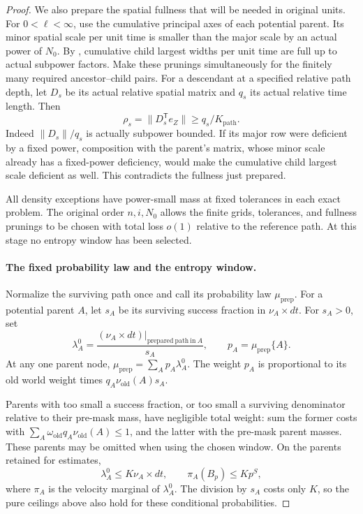 \begin{proof}
We also prepare the spatial fullness that will be needed in original
units.  For \(0<\ell<\infty\), use the cumulative principal axes of
each potential parent.  Its minor spatial scale per unit time is
smaller than the major scale by an actual power of \(N_0\).  By
, cumulative child largest widths per unit
time are full up to actual subpower factors.  Make these prunings
simultaneously for the finitely many required ancestor--child pairs.
For a descendant at a specified relative path depth, let \(D_s\) be
its actual relative spatial matrix and \(q_s\) its actual relative
time length.  Then
\[
 \rho_s=\|D_s^{\mathsf T}e_Z\|
       \ge q_s/K_{\mathrm{path}}.
\]
Indeed \(\|D_s\|/q_s\) is actually subpower bounded.  If its major
row were deficient by a fixed power, composition with the parent's
matrix, whose minor scale already has a fixed-power deficiency, would
make the cumulative child largest scale deficient as well.  This
contradicts the fullness just prepared.

All density exceptions have power-small mass at fixed tolerances in
each exact problem.  The original order \(n,i,N_0\) allows the finite
grids, tolerances, and fullness prunings to be chosen with total loss
\(o(1)\) relative to the reference path.  At this stage no entropy
window has been selected.

\paragraph{The fixed probability law and the entropy window.}
Normalize the surviving path once and call its probability law
\(\mu_{\mathrm{prep}}\).  For a potential parent \(A\), let \(s_A\)
be its surviving success fraction in \(\nu_A\times dt\).  For
\(s_A>0\), set
\[
 \lambda_A^0
   =\frac{(\nu_A\times dt)|_{\mathrm{prepared\ path\ in}\ A}}{s_A},
 \qquad p_A=\mu_{\mathrm{prep}}\{A\}.
\]
At any one parent node,
\(\mu_{\mathrm{prep}}=\sum_Ap_A\lambda_A^0\).
The weight \(p_A\) is proportional to its old world weight times
\(q_A\nu_{\mathrm{old}}(A)s_A\).

Parents with too small a success fraction, or too small a surviving
denominator relative to their pre-mask mass, have negligible total
weight: sum the former costs with
\(\sum_A\omega_{\mathrm{old}}q_A\nu_{\mathrm{old}}(A)\le1\),
and the latter with the pre-mask parent masses.  These parents may be
omitted when using the chosen window.  On the parents retained for
estimates,
\begin{equation}
 \lambda_A^0\le K\nu_A\times dt,
 \qquad \pi_A(B_p)\le Kp^S,
 \label{a03:prepared-parent-law}
\end{equation}
where \(\pi_A\) is the velocity marginal of \(\lambda_A^0\).
The division by \(s_A\) costs only \(K\), so the pure ceilings above
also hold for these conditional probabilities.


\end{proof}
